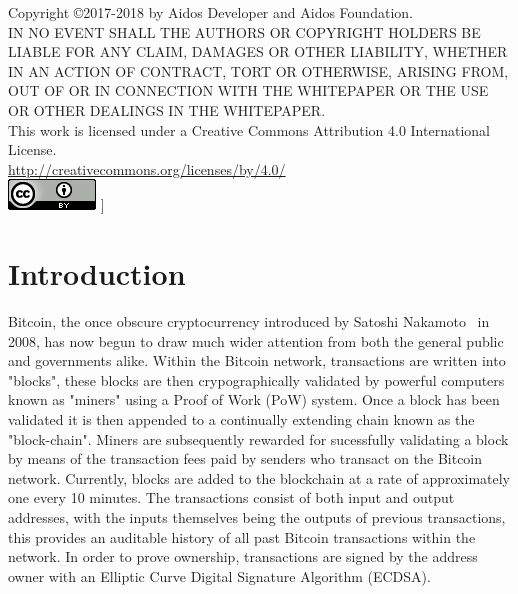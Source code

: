 \documentclass[a4paper,10pt,twocolumn]{article}
\begin{document}
Copyright \copyright 2017-2018 by Aidos Developer and Aidos Foundation. \\

IN NO EVENT SHALL THE AUTHORS OR COPYRIGHT HOLDERS BE LIABLE FOR ANY CLAIM, DAMAGES OR OTHER
LIABILITY, WHETHER IN AN ACTION OF CONTRACT, TORT OR OTHERWISE, ARISING FROM,
OUT OF OR IN CONNECTION WITH THE WHITEPAPER OR THE USE OR OTHER DEALINGS IN
THE WHITEPAPER. \\

This work is licensed under a Creative Commons Attribution 4.0 International License. \\
\url{http://creativecommons.org/licenses/by/4.0/} \\
\includegraphics{cc}
]

\twocolumn[
\tableofcontents
]

\clearpage

\section{Introduction}
Bitcoin, the once obscure cryptocurrency introduced by Satoshi Nakamoto~\cite{btc} in 2008, has now begun to draw much wider attention 
from both the general public and governments alike. Within the Bitcoin network, transactions are written into "blocks", these blocks are 
then crypographically validated by powerful computers known as "miners" using a Proof of Work (PoW) system. Once a block has been 
validated it is then appended to a continually extending chain known as the "block-chain". Miners are subsequently rewarded for 
sucessfully validating a block by means of the transaction fees paid by senders who transact on the Bitcoin network. Currently, blocks 
are added to the blockchain at a rate of approximately one every 10 minutes. The transactions consist of both input and output 
addresses, with the inputs themselves being the outputs of previous transactions, this provides an auditable history of all past Bitcoin 
transactions within the network. In order to prove ownership, transactions are signed by the address owner with an Elliptic Curve 
Digital Signature Algorithm (ECDSA).
\end{document}
